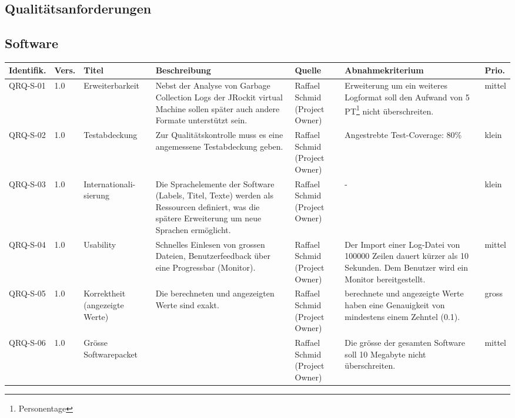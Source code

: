 \begin{landscape}
\section{Qualitätsanforderungen}
\subsection{Software}\label{anforderungen_software}
\begin{longtable}{|p{1.6cm}|p{0.7cm}|p{2.5cm}|p{4.5cm}|p{2.6cm}|p{4cm}|p{0.9cm}|}
    \hline
    \textbf{Identifik.} & \textbf{Vers.}& \textbf{Titel} & \textbf{Beschreibung} & \textbf{Quelle} & \textbf{Abnahmekriterium} & \textbf{Prio.}\\\hline
   QRQ-S-01 & 1.0 & Erweiterbarkeit & Nebst der Analyse von Garbage Collection Logs der JRockit virtual Machine sollen später auch andere Formate unterstützt sein. & Raffael Schmid (Project Owner) & Erweiterung um ein weiteres Logformat soll den Aufwand von 5 PT\footnote{Personentage} nicht überschreiten. & mittel \\\hline
   QRQ-S-02 & 1.0 & Testabdeckung & Zur Qualitätskontrolle muss es eine angemessene Testabdeckung geben. & Raffael Schmid (Project Owner) & Angestrebte Test-Coverage: 80\% & klein \\\hline

  QRQ-S-03 & 1.0 & Internationali-sierung & Die Sprachelemente der Software (Labels, Titel, Texte) werden als Ressourcen definiert, was die spätere Erweiterung um neue Sprachen ermöglicht. & Raffael Schmid (Project Owner) & - & klein\\\hline

   QRQ-S-04 & 1.0 & Usability & Schnelles Einlesen von grossen Dateien, Benutzerfeedback über eine Progressbar (Monitor). & Raffael Schmid (Project Owner) & Der Import einer Log-Datei von 100000 Zeilen dauert kürzer als 10 Sekunden. Dem Benutzer wird ein Monitor bereitgestellt.&mittel \\\hline

  QRQ-S-05 & 1.0 & Korrektheit (angezeigte Werte) & Die berechneten und angezeigten Werte sind exakt. & Raffael Schmid (Project Owner) & berechnete und angezeigte Werte haben eine Genauigkeit von mindestens einem Zehntel (0.1). & gross\\\hline
  
QRQ-S-06 & 1.0 & Grösse Softwarepacket & & Raffael Schmid (Project Owner) & Die grösse der gesamten Software soll 10 Megabyte nicht überschreiten. & mittel\\\hline


\end{longtable}
\end{landscape}
